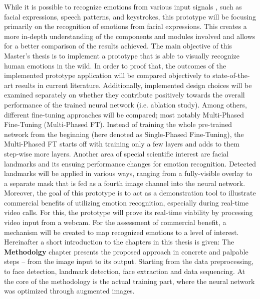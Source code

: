 While it is possible to recognize emotions from various input signals \citep{Akcay:2020:SpeechEmotionRecognition(SER)}, such as facial expressions, speech patterns, and keystrokes, this prototype will be focusing primarily on the recognition of emotions from facial expressions. This creates a more in-depth understanding of the components and modules involved and allows for a better comparison of the results achieved.
\newline\newline
The main objective of this Master's thesis is to implement a prototype that is able to visually recognize human emotions in the wild. In order to proof that, the outcomes of the implemented prototype application will be compared objectively to state-of-the-art results in current literature.
\newline\newline
Additionally, implemented design choices will be examined separately on whether they contribute positively towards the overall performance of the trained neural network (i.e. ablation study). Among others, different fine-tuning approaches will be compared; most notably Multi-Phased Fine-Tuning (Multi-Phased FT). Instead of training the whole pre-trained network from the beginning (here denoted as Single-Phased Fine-Tuning), the Multi-Phased FT starts off with training only a few layers and adds to them step-wise more layers.
\newline\newline
Another area of special scientific interest are facial landmarks and its ensuing performance changes for emotion recognition. Detected landmarks will be applied in various ways, ranging from a fully-visible overlay to a separate mask that is fed as a fourth image channel into the neural network.
\newline\newline
Moreover, the goal of this prototype is to act as a demonstration tool to illustrate commercial benefits of utilizing emotion recognition, especially during real-time video calls. For this, the prototype will prove its real-time viability by processing video input from a webcam. For the assessment of commercial benefit, a mechanism will be created to map recognized emotions to a level of interest.
\newline\newline
Hereinafter a short introduction to the chapters in this thesis is given:\newline
The \textbf{Methodolgy} chapter presents the proposed approach in concrete and palpable steps -- from the image input to its output. Starting from the data preprocessing, to face detection, landmark detection, face extraction and data sequencing. At the core of the methodology is the actual training part, where the neural network was optimized through augmented images.
